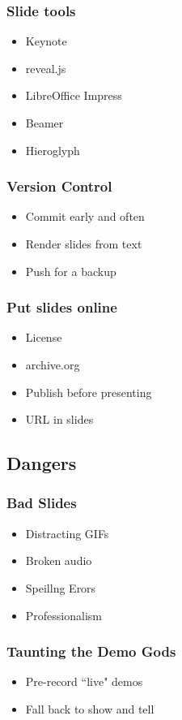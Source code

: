 \documentclass{beamer}
\begin{document}
\begin{frame}[fragile]
\frametitle{Slide tools}
\begin{itemize}[<+(1)->]
\item Keynote
\item reveal.js
\item LibreOffice Impress
\item Beamer
\item Hieroglyph
\end{itemize}
\end{frame}

\begin{frame}[fragile]
\frametitle{Version Control}
\begin{itemize}[<+(1)->]
\item Commit early and often
\item Render slides from text
\item Push for a backup
\end{itemize}
\end{frame}

\begin{frame}[fragile]
\frametitle{Put slides online}
\begin{itemize}[<+(1)->]
\item License
\item archive.org
\item Publish before presenting
\item URL in slides
\end{itemize}
\end{frame}

\subsection{Dangers}

\begin{frame}[fragile]
\frametitle{Bad Slides}
\begin{itemize}[<+(1)->]
\item Distracting GIFs
\item Broken audio
\item Speillng Erors
\item Professionalism
\end{itemize}
\end{frame}

\begin{frame}[fragile]
\frametitle{Taunting the Demo Gods}
\begin{itemize}[<+(1)->]
\item Pre-record ``live" demos
\item Fall back to show and tell
\end{itemize}
\end{frame}
\end{document}
